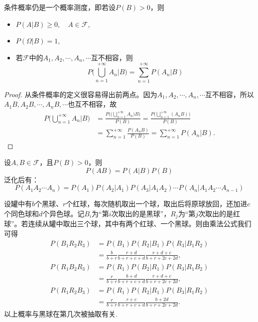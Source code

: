 \begin{proposition}
    条件概率仍是一个概率测度，即若设$P(B) > 0$，则
    \begin{itemize}
        \item$P(A|B) \ge 0, \quad A \in \mathscr{F}$,
        \item$P(\Omega|B) = 1$,
        \item 若$\mathscr{F}$中的$A_1, A_2, \cdots , A_n, \cdots$互不相容，则
              \[ P \biggl( \bigcup_{n=1}^{+\infty} A_n | B \biggr) = \sum_{n=1}^{+\infty} P(A_n | B) \]
    \end{itemize}
\end{proposition}
\begin{proof}
    从条件概率的定义很容易得出前两点。因为$A_1, A_2, \cdots , A_n, \cdots$互不相容，所以$A_1B, A_2B, \cdots , A_nB, \cdots$也互不相容，故
    \begin{align*}
        P \biggl( \bigcup_{n=1}^{+\infty} A_n | B \biggr)
         & = \frac{P \Biggl( \biggl( \bigcup_{n=1}^{+\infty} A_n \biggr) B \Biggr)}{P(B)}
        = \frac{P \biggl( \bigcup_{n=1}^{+\infty} (A_n B) \biggr)}{P(B)}                  \\
         & = \sum_{n=1}^{+\infty} \frac{P(A_n B)}{P(B)}
        = \sum_{n=1}^{+\infty} P(A_n | B).
    \end{align*}
\end{proof}

\begin{theorem}[乘法法则]
    设$A,B \in \mathscr{F}$，且$P(B)>0$，则
    \[ P(AB) = P(A|B)P(B) \]
    泛化后有：
    \[ P(A_1 A_2 \cdots A_n) = P(A_{1})P(A_2|A_1)P(A_3|A_1 A_2) \cdots P(A_n|A_1 A_2 \cdots A_{n-1}) \]
\end{theorem}

\begin{example}[罐子模型]\label{ex:pot_model}
    设罐中有$b$个黑球、$r$个红球，每次随机取出一个球，取出后将原球放回，还加进$c$个同色球和$d$个异色球。记$B_i$为“第$i$次取出的是黑球”，$R_j$为“第$j$次取出的是红球”。若连续从罐中取出三个球，其中有两个红球、一个黑球。则由乘法公式我们可得
    \begin{align*}
        P(B_1 R_2 R_3)
         & = P(B_1) P(R_2 | B_1) P(R_3 | B_1 R_2)                       \\
         & = \frac{b}{b+r} \frac{r+d}{b+r+c+d} \frac{r+d+c}{b+r+2c+2d}, \\
        P(R_1 B_2 R_3)
         & = P(R_1) P(B_2 | R_1) P(R_3 | R_1 B_2)                       \\
         & = \frac{r}{b+r} \frac{b+d}{b+r+c+d} \frac{r+d+c}{b+r+2c+2d}, \\
        P(R_1 R_2 B_3)
         & = P(R_1) P(R_2 | R_1) P(B_3 | R_1 R_2)                       \\
         & = \frac{r}{b+r} \frac{r+c}{b+r+c+d} \frac{b+2d}{b+r+2c+2d}.
    \end{align*}
    以上概率与黑球在第几次被抽取有关.
\end{example}

